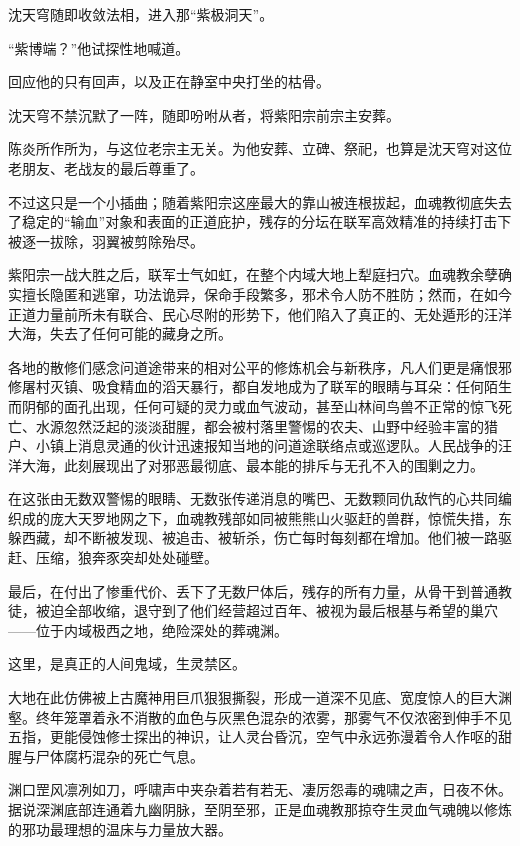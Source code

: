 沈天穹随即收敛法相，进入那“紫极洞天”。

“紫博端？”他试探性地喊道。

回应他的只有回声，以及正在静室中央打坐的枯骨。

沈天穹不禁沉默了一阵，随即吩咐从者，将紫阳宗前宗主安葬。

陈炎所作所为，与这位老宗主无关。为他安葬、立碑、祭祀，也算是沈天穹对这位老朋友、老战友的最后尊重了。

\vspace{2em}

不过这只是一个小插曲；随着紫阳宗这座最大的靠山被连根拔起，血魂教彻底失去了稳定的“输血”对象和表面的正道庇护，残存的分坛在联军高效精准的持续打击下被逐一拔除，羽翼被剪除殆尽。

紫阳宗一战大胜之后，联军士气如虹，在整个内域大地上犁庭扫穴。血魂教余孽确实擅长隐匿和逃窜，功法诡异，保命手段繁多，邪术令人防不胜防；然而，在如今正道力量前所未有联合、民心尽附的形势下，他们陷入了真正的、无处遁形的汪洋大海，失去了任何可能的藏身之所。

各地的散修们感念问道途带来的相对公平的修炼机会与新秩序，凡人们更是痛恨邪修屠村灭镇、吸食精血的滔天暴行，都自发地成为了联军的眼睛与耳朵：任何陌生而阴郁的面孔出现，任何可疑的灵力或血气波动，甚至山林间鸟兽不正常的惊飞死亡、水源忽然泛起的淡淡甜腥，都会被村落里警惕的农夫、山野中经验丰富的猎户、小镇上消息灵通的伙计迅速报知当地的问道途联络点或巡逻队。人民战争的汪洋大海，此刻展现出了对邪恶最彻底、最本能的排斥与无孔不入的围剿之力。

在这张由无数双警惕的眼睛、无数张传递消息的嘴巴、无数颗同仇敌忾的心共同编织成的庞大天罗地网之下，血魂教残部如同被熊熊山火驱赶的兽群，惊慌失措，东躲西藏，却不断被发现、被追击、被斩杀，伤亡每时每刻都在增加。他们被一路驱赶、压缩，狼奔豕突却处处碰壁。

最后，在付出了惨重代价、丢下了无数尸体后，残存的所有力量，从骨干到普通教徒，被迫全部收缩，退守到了他们经营超过百年、被视为最后根基与希望的巢穴——位于内域极西之地，绝险深处的葬魂渊。

\vspace{2em}

这里，是真正的人间鬼域，生灵禁区。

大地在此仿佛被上古魔神用巨爪狠狠撕裂，形成一道深不见底、宽度惊人的巨大渊壑。终年笼罩着永不消散的血色与灰黑色混杂的浓雾，那雾气不仅浓密到伸手不见五指，更能侵蚀修士探出的神识，让人灵台昏沉，空气中永远弥漫着令人作呕的甜腥与尸体腐朽混杂的死亡气息。

渊口罡风凛冽如刀，呼啸声中夹杂着若有若无、凄厉怨毒的魂啸之声，日夜不休。据说深渊底部连通着九幽阴脉，至阴至邪，正是血魂教那掠夺生灵血气魂魄以修炼的邪功最理想的温床与力量放大器。

